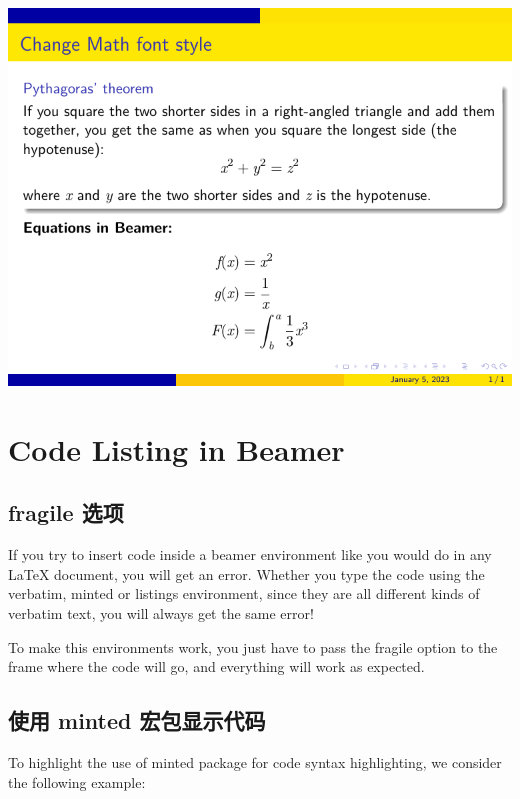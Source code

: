 \includegraphics{examples/beamer/font-theme-change-math-font-style2.pdf}

\section{Code Listing in Beamer}

\subsection{{\ttfamily fragile} 选项}

If you try to insert code inside a beamer environment like you would do in any LaTeX document, you will get an error. Whether you type the code using the verbatim, minted or listings environment, since they are all different kinds of verbatim text, you will always get the same error!

To make this environments work, you just have to pass the {\ttfamily fragile} option to the frame where the code will go, and everything will work as expected. 

\subsection{使用 minted 宏包显示代码}

To highlight the use of minted package for code syntax highlighting, we consider the following example:

\inputminted[linenos=true]{latex}{examples/beamer/code-listing-with-minted.tex}

